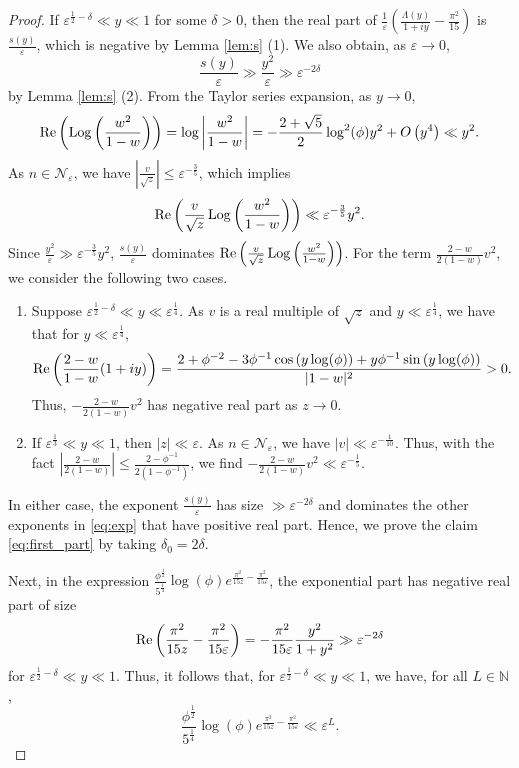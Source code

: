 \documentclass[11pt,reqno]{amsart}
\theoremstyle{remark}
\numberwithin{equation}{section}
\def\Log{\operatorname{Log}}
\renewcommand{\Re}{{\rm Re}}
\renewcommand{\Re}{{\rm Re}}
\def\Log{\operatorname{Log}}
\begin{document}
\begin{proof}
If $\varepsilon^{\frac12-\delta} \ll y \ll 1$ for some $\delta>0$, then %
the real part of $\frac{1}{\varepsilon}\left(\frac{\Lambda(y)}{1+iy}-\frac{\pi^2}{15}\right)$ is $\frac{s(y)}{\varepsilon}$, which is negative by Lemma \ref{lem:s} (1). We also obtain, as $\varepsilon \to 0$, 
\[
	\frac{s(y)}{\varepsilon} \gg \frac{y^2}{\varepsilon} \gg \varepsilon^{-2\delta}
\]
by Lemma \ref{lem:s} (2). 
From the Taylor series expansion, as $y \to 0$, 
\[
	\Re\left( \Log\left(\frac{w^2}{1-w}\right) \right) = \log \left|\frac{w^2}{1-w} \right| = -\frac{2+\sqrt{5}}{2} \log^2(\phi) y^2 + O\left(y^4\right) \ll y^2.
\]
As $n \in \mathcal{N}_{\varepsilon}$, we have $\left|\frac{v}{\sqrt{z}}\right| \leq \varepsilon^{-\frac35}$, which implies
\[
	\Re\left( \frac{v}{\sqrt{z}} \Log\left(\frac{w^2}{1-w}\right) \right) \ll \varepsilon^{-\frac35} y^2.
\]	
Since $\frac{y^2}{\varepsilon} \gg \varepsilon^{-\frac35} y^2$, $\frac{s(y)}{\varepsilon}$ dominates $\Re\left( \frac{v}{\sqrt{z}} \Log\left(\frac{w^2}{1-w}\right) \right)$. For the term $\frac{2-w}{2(1-w)}v^2$, we consider the following two cases. 
\begin{enumerate}
	\item Suppose $\varepsilon^{\frac12-\delta} \ll y \ll \varepsilon^{\frac14}$. As $v$ is a real multiple of $\sqrt{z}$ and $y\ll \varepsilon^{\frac14}$, we have that for $y \ll \varepsilon^{\frac14}$,
	\[
		\Re \left(\frac{2-w}{1-w} (1+iy)\right) = \frac{2+\phi^{-2}-3\phi^{-1}\cos\left(y\log(\phi)\right)+y\phi^{-1}\sin\left(y\log(\phi)\right)}{|1-w|^2} >0.
	\]
	Thus, $-\frac{2-w}{2(1-w)}v^2$ has negative real part as $z\to 0$.
	
	\item If $\varepsilon^{\frac13} \ll y \ll 1$, then $|z|\ll \varepsilon$. As $n \in \mathcal{N}_{\varepsilon}$, we have $|v|\ll \varepsilon^{-\frac1{10}}$. Thus, with the fact $\left|\frac{2-w}{2(1-w)}\right| \leq \frac{2-\phi^{-1}}{2(1-\phi^{-1})}$, we find $-\frac{2-w}{2(1-w)}v^2 \ll  \varepsilon^{-\frac15}$. %
\end{enumerate}
In either case, the exponent $\frac{s(y)}{\varepsilon}$ has size $\gg \varepsilon^{-2\delta}$ and dominates the other exponents in \eqref{eq:exp} that have positive real part. Hence, we prove the claim \eqref{eq:first_part} by taking $\delta_0=2\delta$.

Next, in the expression $\frac{\phi^{\frac12} }{5^{\frac14}}\log(\phi) e^{\frac{\pi^2}{15 z}-\frac{\pi^2}{15\varepsilon}}$, the exponential part has negative real part of size
\[
	\Re\left(\frac{\pi^2}{15 z}-\frac{\pi^2}{15\varepsilon}\right)%
	= - \frac{\pi^2}{15\varepsilon} \frac{y^2}{1+y^2} \gg \varepsilon^{-2\delta}
\]
for $\varepsilon^{\frac12-\delta} \ll y \ll 1$. Thus, it follows that, for $\varepsilon^{\frac12-\delta} \ll y \ll 1$, we have, for all $L \in \mathbb{N}$,
\[
	\frac{\phi^{\frac12} }{5^{\frac14}}\log(\phi) e^{\frac{\pi^2}{15 z}-\frac{\pi^2}{15\varepsilon}} \ll \varepsilon^L.
\]
\end{proof}
\end{document}

